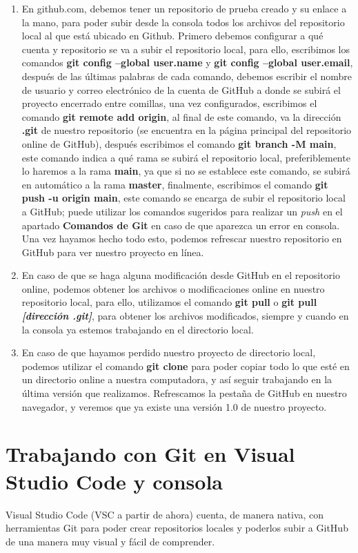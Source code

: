 \begin{enumerate}
    \item En github.com, debemos tener un repositorio de prueba creado y su enlace a la mano, para poder subir desde la consola todos los archivos del repositorio local al que está ubicado en Github. Primero debemos configurar a qué cuenta y repositorio se va a subir el repositorio local, para ello, escribimos los comandos \textbf{git config –global user.name} y \textbf{git config –global user.email}, después de las últimas palabras de cada comando, debemos escribir el nombre de usuario y correo electrónico de la cuenta de GitHub a donde se subirá el proyecto encerrado entre comillas, una vez configurados, escribimos el comando \textbf{git remote add origin}, al final de este comando, va la dirección \textbf{.git} de nuestro repositorio (se encuentra en la página principal del repositorio online de GitHub), después escribimos el comando \textbf{git branch -M main}, este comando indica a qué rama se subirá el repositorio local, preferiblemente lo haremos a la rama \textbf{main}, ya que si no se establece este comando, se subirá en automático a la rama \textbf{master}, finalmente, escribimos el comando \textbf{git push -u origin main}, este comando se encarga de subir el repositorio local a GitHub; puede utilizar los comandos sugeridos para realizar un \textit{push} en el apartado \textbf{Comandos de Git} en caso de que aparezca un error en consola. Una vez hayamos hecho todo esto, podemos refrescar nuestro repositorio en GitHub para ver nuestro proyecto en línea.
    \item En caso de que se haga alguna modificación desde GitHub en el repositorio online, podemos obtener los archivos o modificaciones online en nuestro repositorio local, para ello, utilizamos el comando \textbf{git pull} o \textbf{git pull \textit{[dirección .git]}}, para obtener los archivos modificados, siempre y cuando en la consola ya estemos trabajando en el directorio local.
    \item En caso de que hayamos perdido nuestro proyecto de directorio local, podemos utilizar el comando \textbf{git clone} para poder copiar todo lo que esté en un directorio online a nuestra computadora, y así seguir trabajando en la última versión que realizamos. Refrescamos la pestaña de GitHub en nuestro navegador, y veremos que ya existe una versión 1.0 de nuestro proyecto.
\end{enumerate}





\section{Trabajando con Git en Visual Studio Code y consola}
\hspace{0.55cm}Visual Studio Code (VSC a partir de ahora) cuenta, de manera nativa, con herramientas Git para poder crear repositorios locales y poderlos subir a GitHub de una manera muy visual y fácil de comprender.

